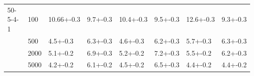 \documentclass{svmult}
\begin{document}
\begin{table}[]
\begin{tabular}{llllllll}
50-5-4-1   & 100     & 10.66+-0.3      & \cellcolor{lightgray}9.7+-0.3     & 10.4+-0.3  & \cellcolor{lightgray}9.5+-0.3 & 12.6+-0.3 & \cellcolor{lightgray}9.3+-0.3   \\
		   & 500     & \cellcolor{lightgray}4.5+-0.3      & 6.3+-0.3     & \cellcolor{lightgray}4.6+-0.3  & 6.2+-0.3 & 5.7+-0.3 & 6.3+-0.3 \\
           & 2000    & \cellcolor{lightgray}5.1+-0.2      & 6.9+-0.3     & \cellcolor{lightgray}5.2+-0.2  & 7.2+-0.3 & \cellcolor{lightgray}5.5+-0.2 & 6.2+-0.3 \\
           & 5000    & \cellcolor{lightgray}4.2+-0.2      & 6.1+-0.2     & \cellcolor{lightgray}4.5+-0.2  & 6.5+-0.3 & \cellcolor{lightgray}4.4+-0.2 & \cellcolor{lightgray}4.4+-0.2 \\ \hline
\end{tabular}
\end{table}
\end{document}
